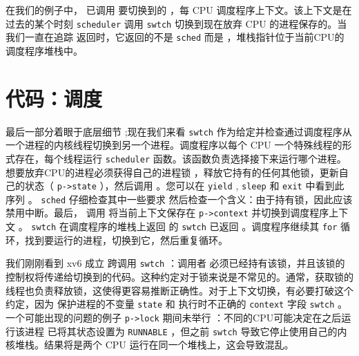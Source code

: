 在我们的例子中，
 已调用       
 要切换到的       
        ，每 CPU 调度程序上下文。该上下文是在过去的某个时刻
    \lstinline{scheduler}    调用
    \lstinline{swtch}   
         切换到现在放弃 CPU 的进程保存的。当我们一直在追踪       返回时，它返回的不是
    \lstinline{sched}    而是
        ，堆栈指针位于当前CPU的调度程序堆栈中。
    \section{代码：调度  }     

最后一部分着眼于底层细节
        ;现在我们来看
    \lstinline{swtch}    作为给定并检查通过调度程序从一个进程的内核线程切换到另一个进程。调度程序以每个 CPU 一个特殊线程的形式存在，每个线程运行
    \lstinline{scheduler}    函数。该函数负责选择接下来运行哪个进程。想要放弃CPU的进程必须获得自己的进程锁
        ，释放它持有的任何其他锁，更新自己的状态（    \lstinline{p->state}    ），然后调用
        。您可以在
    \lstinline{yield}   
        ,
    \texttt{sleep}    和
    \texttt{exit} 中看到此序列   。
    \lstinline{sched}    仔细检查其中一些要求
        然后检查一个含义：由于持有锁，因此应该禁用中断。最后，
        调用
        将当前上下文保存在
    \lstinline{p->context}    并切换到调度程序上下文
        。
    \lstinline{swtch}    在调度程序的堆栈上返回
        的
    \lstinline{swtch}    已返回
        。调度程序继续其
    \lstinline{for}   循环，找到要运行的进程，切换到它，然后重复循环。  

我们刚刚看到 xv6 成立
        跨调用
    \lstinline{swtch}    ：调用者
        必须已经持有该锁，并且该锁的控制权将传递给切换到的代码。这种约定对于锁来说是不常见的。通常，获取锁的线程也负责释放锁，这使得更容易推断正确性。对于上下文切换，有必要打破这个约定，因为
        保护进程的不变量
    \lstinline{state}    和
 执行时不正确的    \lstinline{context}    字段
    \lstinline{swtch}    。一个可能出现的问题的例子
    \lstinline{p->lock}    期间未举行
       ：不同的CPU可能决定在之后运行该进程
        已将其状态设置为
    \lstinline{RUNNABLE}    ，但之前
    \lstinline{swtch}    导致它停止使用自己的内核堆栈。结果将是两个 CPU 运行在同一个堆栈上，这会导致混乱。  

